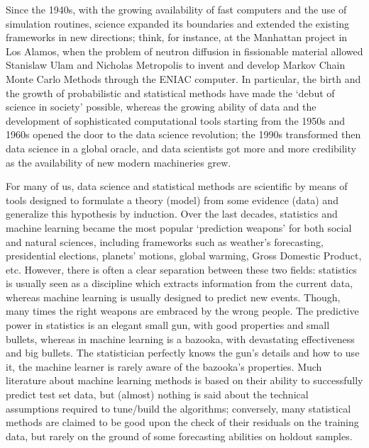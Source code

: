 \documentclass{statsoc}
\begin{document}
Since the 1940s, with the growing availability of fast computers and the use of simulation routines, science expanded its boundaries and extended the existing frameworks in new directions; think, for instance, at the Manhattan project in Los Alamos, when the problem of neutron diffusion in fissionable material allowed Stanislaw Ulam and Nicholas Metropolis to invent and develop Markov Chain Monte Carlo Methods through the ENIAC computer. In particular, the birth 
and the growth of probabilistic and statistical methods have made the `debut of science in society' possible, whereas the growing ability of data and the development of sophisticated computational 
tools starting from the 1950s and 1960s opened the door to the data science revolution; the 1990s transformed then data science in a 
global oracle, and data scientists got more and more credibility as the availability of new modern machineries grew.

For many of us, data science and statistical methods 
are scientific by means of tools designed to formulate a theory (model) from some evidence (data) and generalize this hypothesis by induction.
Over the last decades, statistics and machine learning became the most popular `prediction weapons' for both social and natural sciences, including frameworks such as weather's forecasting, presidential elections, planets' motions, global warming, Gross Domestic Product, etc. However, there is often a clear separation between these two fields: statistics is usually seen as a discipline which extracts information from the current data, whereas machine learning is usually designed to predict new events.  Though, many times the right weapons are embraced by the wrong people. The predictive power in statistics is an elegant small 
gun, with good properties and small bullets, whereas in machine learning is a bazooka, with devastating effectiveness and big bullets. The statistician perfectly knows the gun's details and how to use it, the machine learner is rarely aware of the bazooka's properties. Much literature about machine learning methods \citep{breiman2001statistical} is based on their ability to successfully predict test set 
data, but (almost) nothing is said about the technical assumptions required to tune/build the algorithms; conversely, many statistical methods are claimed to be good upon the check of 
their residuals on the training data, but rarely on the ground of some forecasting abilities on holdout samples.
 
\end{document}
